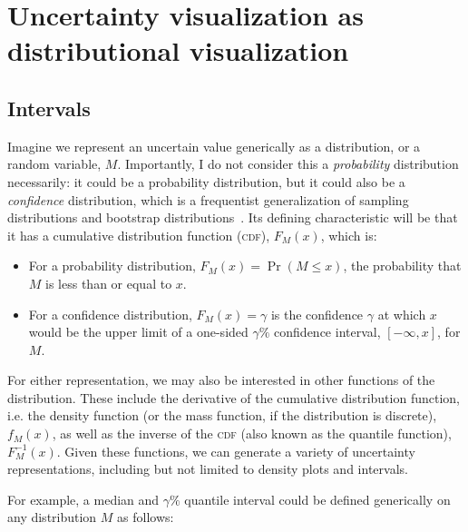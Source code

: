 \documentclass[journal]{vgtc}                     %
\begin{document}
\section{Uncertainty visualization as\\distributional visualization}

\subsection{Intervals}

Imagine we represent an uncertain value generically as a distribution, or a random variable, $M$. Importantly, I do not consider this a \textit{probability} distribution necessarily: it could be a probability distribution, but it could also be a \textit{confidence} distribution, which is a frequentist generalization of sampling distributions and bootstrap distributions~\cite{xie2013confidence}. Its defining characteristic will be that it has a cumulative distribution function (\textsc{cdf}), $F_M(x)$, which is:
\begin{itemize}
    \item For a probability distribution, $F_M(x) = \Pr(M \le x)$, the probability that $M$ is less than or equal to $x$.
    \item   For a confidence distribution, $F_M(x) = \gamma$  is the confidence $\gamma$ at which $x$ would be the upper limit of a one-sided $\gamma\%$ confidence interval, $[-\infty, x]$, for $M$. %
\end{itemize}

For either representation, we may also be interested in other functions of the distribution. These include the derivative of the cumulative distribution function, i.e. the density function (or the mass function, if the distribution is discrete), $f_M(x)$, as well as the inverse of the \textsc{cdf} (also known as the quantile function), $F_M^{-1}(x)$. Given these functions, we can generate a variety of uncertainty representations, including but not limited to density plots and intervals.

For example, a median and $\gamma\%$ quantile interval could be defined generically on any distribution $M$ as follows:
\end{document}

